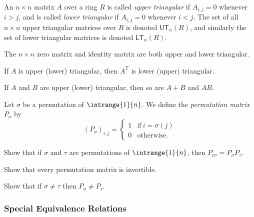 \begin{exercises}
\ResumeExercises
\item{\label{exr:triangular-matrices}}
An $n \times n$ matrix $A$ over a ring $R$ is called \emph{upper triangular} if $A_{i,j} = 0$ whenever $i > j$, and is called \emph{lower triangular} if $A_{i,j} = 0$ whenever $i < j$. The set of all $n \times n$ upper triangular matrices over $R$ is denoted $\mathsf{UT}_n(R)$, and similarly the set of lower triangular matrices is denoted $\mathsf{LT}_n(R)$.
\begin{enumerate*}
\item The $n \times n$ zero matrix and identity matrix are both upper and lower triangular.
\item If $A$ is upper (lower) triangular, then $A^\mathsf{T}$ is lower (upper) triangular.
\item If $A$ and $B$ are upper (lower) triangular, then so are $A+B$ and $AB$.
\end{enumerate*}

\item{\label{exr:permutation-matrices}}%
Let $\sigma$ be a permutation of $\intrange{1}{n}$. We define the \emph{permutation matrix} $P_\sigma$ by \[ (P_\sigma)_{i,j} = \left\{\begin{array}{cl} 1 & \mathrm{if}\ i = \sigma(j) \\ 0 & \mathrm{otherwise.} \end{array}\right. \]
\begin{enumerate*}
\item Show that if $\sigma$ and $\tau$ are permutations of $\intrange{1}{n}$, then $P_{\sigma\tau} = P_\sigma P_\tau$.
\item Show that every permutation matrix is invertible.
\item Show that if $\sigma \neq \tau$ then $P_\sigma \neq P_\tau$.
\end{enumerate*}

\PauseExercises
\end{exercises}

\subsubsection*{Special Equivalence Relations}

